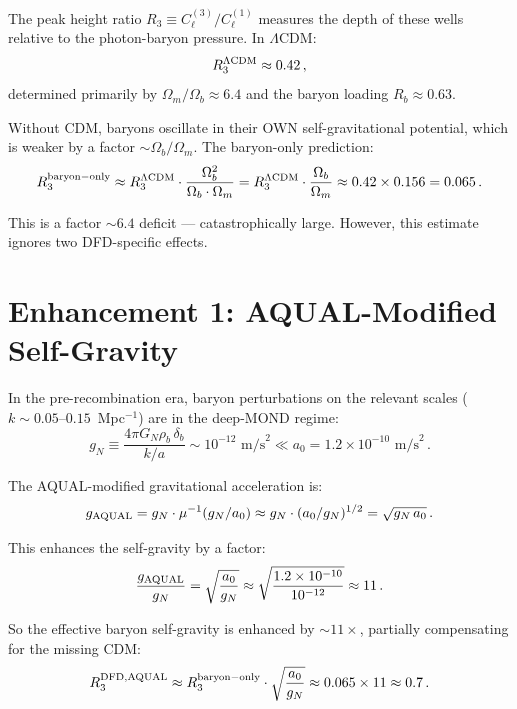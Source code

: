 \documentclass[11pt]{article}
\newcommand{\ee}[1]{\times 10^{#1}}
\newcommand{\LCDM}{$\Lambda$CDM}
\newcommand{\aM}{a_0}
\newcommand{\Ob}{\Omega_b}
\newcommand{\Om}{\Omega_m}
\begin{document}
The peak height ratio $R_3 \equiv C_\ell^{(3)}/C_\ell^{(1)}$ measures
the depth of these wells relative to the photon-baryon pressure.  In \LCDM:
\begin{equation}
R_3^{\Lambda\rm CDM} \approx 0.42\,,
\end{equation}
determined primarily by $\Om/\Ob \approx 6.4$ and the baryon loading
$R_b \approx 0.63$.

Without CDM, baryons oscillate in their OWN self-gravitational potential,
which is weaker by a factor $\sim \Ob/\Om$.  The baryon-only prediction:
\begin{equation}
R_3^{\rm baryon-only} \approx R_3^{\Lambda\rm CDM}\cdot
\frac{\Ob^2}{\Ob\cdot\Om} = R_3^{\Lambda\rm CDM}\cdot\frac{\Ob}{\Om}
\approx 0.42\times 0.156 = 0.065\,.
\end{equation}

This is a factor $\sim 6.4$ deficit --- catastrophically large.  However,
this estimate ignores two DFD-specific effects.

\section{Enhancement 1: AQUAL-Modified Self-Gravity}

In the pre-recombination era, baryon perturbations on the relevant scales
($k \sim 0.05$--$0.15$~Mpc$^{-1}$) are in the deep-MOND regime:
\begin{equation}
g_N \equiv \frac{4\pi G_N \rho_b\,\delta_b}{k/a}
\sim 10^{-12}\text{ m/s}^2 \ll \aM = 1.2\ee{-10}\text{ m/s}^2\,.
\end{equation}

The AQUAL-modified gravitational acceleration is:
\begin{equation}
g_{\rm AQUAL} = g_N\cdot\mu^{-1}(g_N/\aM)
\approx g_N\cdot(\aM/g_N)^{1/2} = \sqrt{g_N\,\aM}\,.
\end{equation}

This enhances the self-gravity by a factor:
\begin{equation}
\frac{g_{\rm AQUAL}}{g_N} = \sqrt{\frac{\aM}{g_N}}
\approx \sqrt{\frac{1.2\ee{-10}}{10^{-12}}} \approx 11\,.
\label{eq:AQUAL-enhance}
\end{equation}

So the effective baryon self-gravity is enhanced by $\sim 11\times$,
partially compensating for the missing CDM:
\begin{equation}
R_3^{\rm DFD,AQUAL} \approx R_3^{\rm baryon-only}\cdot
\sqrt{\frac{\aM}{g_N}} \approx 0.065\times 11 \approx 0.7\,.
\end{equation}
\end{document}
